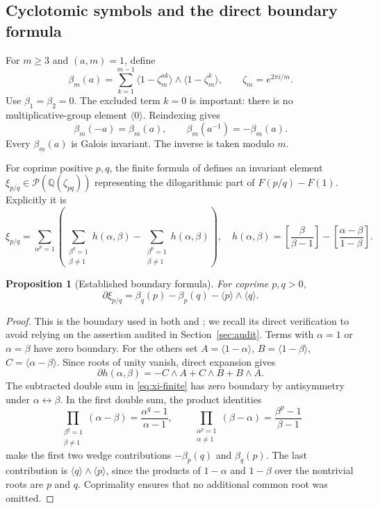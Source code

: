 \documentclass[11pt]{article}
\numberwithin{equation}{section}
\newtheorem{proposition}[theorem]{Proposition}
\theoremstyle{definition}
\theoremstyle{remark}
\newcommand{\Q}{\mathbb Q}
\newcommand{\Pcal}{\mathcal P}
\newcommand{\cl}[1]{\langle #1\rangle}
\newcommand{\inv}{^{-1}}
\begin{document}
\subsection{Cyclotomic symbols and the direct boundary formula}

For $m\ge3$ and $(a,m)=1$, define
\begin{equation}\label{eq:beta}
 \beta_m(a)=\sum_{k=1}^{m-1}
 \cl{1-\zeta_m^{ak}}\wedge\cl{1-\zeta_m^k},
 \qquad \zeta_m=e^{2\pi i/m}.
\end{equation}
Use $\beta_1=\beta_2=0$. The excluded term $k=0$ is important: there is
no multiplicative-group element $\cl0$. Reindexing gives
\begin{equation}\label{eq:symmetries}
 \beta_m(-a)=\beta_m(a),\qquad
 \beta_m(a\inv)=-\beta_m(a).
\end{equation}
Every $\beta_m(a)$ is Galois invariant. The inverse is taken modulo $m$.

For coprime positive $p,q$, the finite formula of \cite[Theorem 3]{RZ}
defines an invariant element $\xi_{p/q}\in\Pcal(\Q(\zeta_{pq}))$
representing the dilogarithmic part of $F(p/q)-F(1)$. Explicitly it is
\begin{equation}\label{eq:xi-finite}
 \xi_{p/q}=\sum_{\alpha^p=1}
 \left(\sum_{\substack{\beta^q=1\\\beta\ne1}}h(\alpha,\beta)
       -\sum_{\substack{\beta^p=1\\\beta\ne1}}h(\alpha,\beta)\right),
 \quad
 h(\alpha,\beta)=
 \left[\frac{\beta}{\beta-1}\right]
 -\left[\frac{\alpha-\beta}{1-\beta}\right].
\end{equation}

\begin{proposition}[Established boundary formula]\label{prop:boundary}
For coprime $p,q>0$,
\begin{equation}\label{eq:boundary-F}
 \partial\xi_{p/q}
 =\beta_q(p)-\beta_p(q)-\cl p\wedge\cl q.
\end{equation}
\end{proposition}
\begin{proof}
This is the boundary used in both \cite{RZ} and \cite{Repo}; we recall its
direct verification to avoid relying on the assertion audited in
Section~\ref{sec:audit}. Terms with $\alpha=1$ or $\alpha=\beta$
have zero boundary. For the others set
$A=\cl{1-\alpha}$, $B=\cl{1-\beta}$, $C=\cl{\alpha-\beta}$.
Since roots of unity vanish, direct expansion gives
\[
 \partial h(\alpha,\beta)=-C\wedge A+C\wedge B+B\wedge A.
\]
The subtracted double sum in \eqref{eq:xi-finite} has zero boundary by
antisymmetry under $\alpha\leftrightarrow\beta$. In the first double
sum, the product identities
\[
 \prod_{\substack{\beta^q=1\\\beta\ne1}}(\alpha-\beta)
 =\frac{\alpha^q-1}{\alpha-1},\qquad
 \prod_{\substack{\alpha^p=1\\\alpha\ne1}}(\beta-\alpha)
 =\frac{\beta^p-1}{\beta-1}
\]
make the first two wedge contributions $-\beta_p(q)$ and $\beta_q(p)$.
The last contribution is $\cl q\wedge\cl p$, since the products of
$1-\alpha$ and $1-\beta$ over the nontrivial roots are $p$ and $q$.
Coprimality ensures that no additional common root was omitted.
\end{proof}
\end{document}

